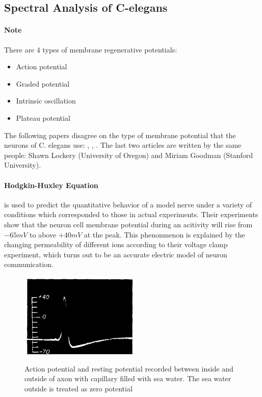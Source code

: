 \subsection{Spectral Analysis of C-elegans}
\label{section: Spectral Analysis}

\paragraph{Note}
There are 4 types of membrane regenerative potentials:
\begin{itemize}
  \item Action potential
  \item Graded potential
  \item Intrinsic oscillation
  \item Plateau potential
\end{itemize}

The following papers disagree on the type of membrane potential that the neurons of C. elegans use: 
\cite{mellem_action_2008}, \cite{lockery_first_2009}, \cite{lockery_quest_2009}.
The last two articles are written by the same people: Shawn Lockery (University of Oregon) and Miriam Goodman (Stanford University).

\paragraph{Hodgkin-Huxley Equation} is used to predict the quantitative behavior of a model nerve under a variety of conditions which corresponded to those in actual
experiments. Their experiments show that the neuron cell membrane potential during an acitivity will rise from $-65mV$ to above $+40mV$ at the peak. This phenonmenon is
explained by the changing permeability of different ions according to their voltage clamp experiment, which turns out to be an accurate electric model of neuron
communication. 

\begin{figure}[h!]
  \centering
  \includegraphics[width=0.5\textwidth]{graphics/ActionPotential}
  \label{fig:action_potential}
  \caption{Action potential and resting potential recorded between inside and outside of axon with capillary filled with sea water. The sea water outside is treated as
zero potential  \cite{Hodgkin_quantitative_1990} }
\end{figure}

